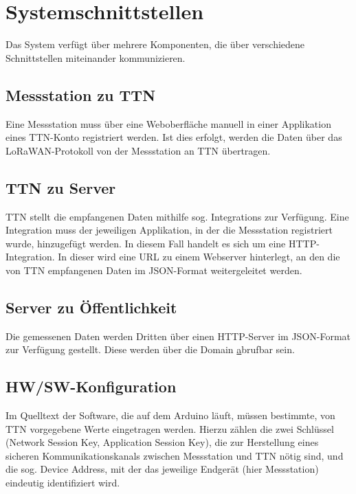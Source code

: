 \section{Systemschnittstellen}

Das System verf\"ugt \"uber mehrere Komponenten, die \"uber verschiedene
Schnittstellen miteinander kommunizieren.

\subsection{Messstation zu TTN}
Eine Messstation muss \"uber eine Weboberfl\"ache manuell in einer Applikation
eines TTN-Konto registriert werden. Ist dies erfolgt, werden die Daten \"uber
das LoRaWAN-Protokoll von der Messstation an TTN \"ubertragen.

\subsection{TTN zu Server}
TTN stellt die empfangenen Daten mithilfe sog. \glqq Integrations\grqq{} zur Verf\"ugung.
Eine \glqq Integration\grqq{} muss der jeweiligen Applikation, in der die Messstation registriert
wurde, hinzugef\"ugt werden.
In diesem Fall handelt es sich um eine \glqq HTTP-Integration\grqq. In dieser wird eine URL zu
einem Webserver hinterlegt, an den die von TTN empfangenen Daten im JSON-Format
weitergeleitet werden.

\subsection{Server zu \"Offentlichkeit}
Die gemessenen Daten werden Dritten \"uber einen HTTP-Server im JSON-Format zur Verf\"ugung gestellt.
Diese werden \"uber die Domain \href{http://www.berlinerdaten.de/} abrufbar sein.

\subsection{HW/SW-Konfiguration}

Im Quelltext der Software, die auf dem Arduino l\"auft, m\"ussen bestimmte, von TTN vorgegebene
Werte eingetragen werden. Hierzu z\"ahlen die zwei Schl\"ussel (\glqq Network Session Key\grqq,
\glqq Application Session Key\grqq), die zur Herstellung eines sicheren Kommunikationskanals
zwischen Messstation und TTN n\"otig sind, und die sog. \glqq Device Address\grqq, mit der
das jeweilige Endger\"at (hier Messstation) eindeutig identifiziert wird.
